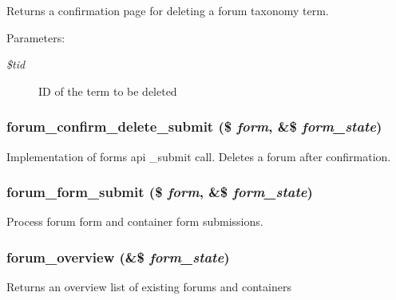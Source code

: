 Returns a confirmation page for deleting a forum taxonomy term.

\begin{Desc}
\item[Parameters:]
\begin{description}
\item[{\em \$tid}]ID of the term to be deleted \end{description}
\end{Desc}
\hypertarget{forum_8admin_8inc_ef93d685b6f28845e233fc1f697c05ab}{
\subsubsection[{forum\_\-confirm\_\-delete\_\-submit}]{\setlength{\rightskip}{0pt plus 5cm}forum\_\-confirm\_\-delete\_\-submit (\$ {\em form}, \/  \&\$ {\em form\_\-state})}}
\label{forum_8admin_8inc_ef93d685b6f28845e233fc1f697c05ab}


Implementation of forms api \_\-submit call. Deletes a forum after confirmation. \hypertarget{forum_8admin_8inc_517cd1e23374b0242a197a3c5250a0c9}{
\subsubsection[{forum\_\-form\_\-submit}]{\setlength{\rightskip}{0pt plus 5cm}forum\_\-form\_\-submit (\$ {\em form}, \/  \&\$ {\em form\_\-state})}}
\label{forum_8admin_8inc_517cd1e23374b0242a197a3c5250a0c9}


Process forum form and container form submissions. \hypertarget{forum_8admin_8inc_73cf6d0144f77c06f14ba36ded4cbcf3}{
\subsubsection[{forum\_\-overview}]{\setlength{\rightskip}{0pt plus 5cm}forum\_\-overview (\&\$ {\em form\_\-state})}}
\label{forum_8admin_8inc_73cf6d0144f77c06f14ba36ded4cbcf3}


Returns an overview list of existing forums and containers 